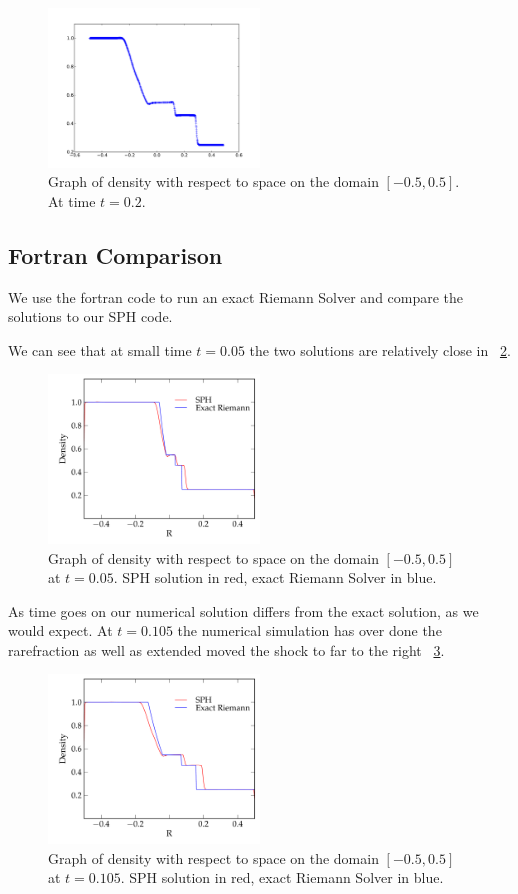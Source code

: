 \documentclass[11pt,letterpaper]{article}
\begin{document}
\begin{figure}[bth]
\centering
\includegraphics[width=0.5\textwidth]{200.pdf}
\caption{Graph of density with respect to space on the domain 
$[-0.5,0.5]$. At time $t = 0.2$.}
\label{fig:200}
\end{figure}

\subsection{Fortran Comparison} 

We use the fortran code to run an exact Riemann Solver and
 compare the solutions to our SPH code. 

We can see that at small time $t = 0.05$ the two solutions are relatively close
in ~\ref{fig:comp050}. 

\begin{figure}[bth]
\centering
\includegraphics[width=0.5\textwidth]{compare050.pdf}
\caption{Graph of density with respect to space on the domain 
$[-0.5,0.5]$ at $t = 0.05$. SPH solution in red, exact Riemann Solver in blue.}
\label{fig:comp050}
\end{figure}

As time goes on our numerical solution differs from the exact solution, as we 
would expect. At $t=0.105$ the numerical simulation has over done the
rarefraction as well as extended moved the shock to far to the right 
~\ref{fig:comp105}. 


\begin{figure}[bth]
\centering
\includegraphics[width=0.5\textwidth]{compare105.pdf}
\caption{Graph of density with respect to space on the domain 
$[-0.5,0.5]$ at $t = 0.105$. SPH solution in red, exact Riemann Solver in blue.}
\label{fig:comp105}
\end{figure}
\end{document}
